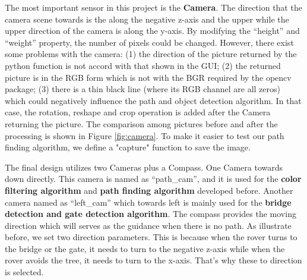 The most important sensor in this project is the \textbf{Camera}. The direction that the camera scene towards is the along the negative z-axis and the upper while the upper direction of the camera is along the y-axis. By modifying the “height” and “weight” property, the number of pixels could be changed. However, there exist some problems with the camera: (1) the direction of the picture returned by the python function is not accord with that shown in the GUI; (2) the returned picture is in the RGB form which is not with the BGR required by the opencv package; (3) there is a thin black line (where its RGB channel are all zeros) which could negatively influence the path and object detection algorithm. In that case, the rotation, reshape and crop operation is added after the Camera returning the picture. The comparison among pictures before and after the processing is shown in Figure \ref{fig:camera}. To make it easier to test our path finding algorithm, we define a "capture" function to save the image.

The final design utilizes two Cameras plus a Compass. One Camera towards down directly. This camera is named as “path\_cam”, and it is used for the \textbf{color filtering algorithm} and \textbf{path finding algorithm} developed before. Another camera named as “left\_cam” which towards left is mainly used for the \textbf{bridge detection and gate detection algorithm}. The compass provides the moving direction which will serves as the guidance when there is no path. As illustrate before, we set two direction parameters. This is because when the rover turns to the bridge or the gate, it needs to turn to the negative z-axis while when the rover avoids the tree, it needs to turn to the x-axis. That’s why these to direction is selected. 

